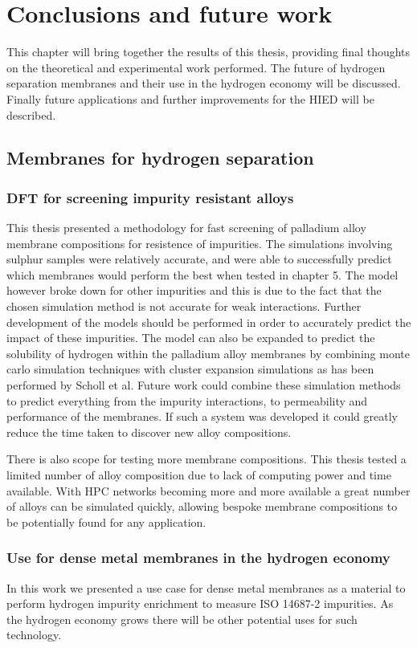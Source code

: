 
\chapter{Conclusions and future work}
This chapter will bring together the results of this thesis, providing final thoughts on the theoretical and experimental work performed. The future of hydrogen separation membranes and their use in the hydrogen economy will be discussed. Finally future applications and further improvements for the HIED will be described.

\section{Membranes for hydrogen separation}
\subsection{DFT for screening impurity resistant alloys}\label{simconc}
This thesis presented a methodology for fast screening of palladium alloy membrane compositions for resistence of impurities. The simulations involving sulphur samples were relatively accurate, and were able to successfully predict which membranes would perform the best when tested in chapter 5. The model however broke down for other impurities and this is due to the fact that the chosen simulation method is not accurate for weak interactions. \cite{dftbook1} Further development of the models should be performed in order to accurately predict the impact of these impurities. The model can also be expanded to predict the solubility of hydrogen within the palladium alloy membranes by combining monte carlo simulation techniques with cluster expansion simulations as has been performed by Scholl et al. \cite{SHOLL2007462} Future work could combine these simulation methods to predict everything from the impurity interactions, to permeability and performance of the membranes. If such a system was developed it could greatly reduce the time taken to discover new alloy compositions. 

There is also scope for testing more membrane compositions. This thesis tested a limited number of alloy composition due to lack of computing power and time available. With HPC networks becoming more and more available \cite{morgan_burt_feldman_2020} a great number of alloys can be simulated quickly, allowing bespoke membrane compositions to be potentially found for any application. 

\subsection{Use for dense metal membranes in the hydrogen economy}
In this work we presented a use case for dense metal membranes as a material to perform hydrogen impurity enrichment to measure ISO 14687-2 impurities. As the hydrogen economy grows there will be other potential uses for such technology. 

